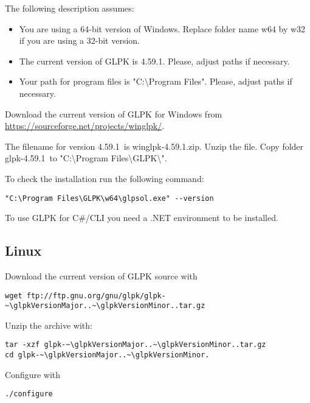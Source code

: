 \documentclass[a4paper,11pt]{report}
\newcommand{\glpkVersionMajor}{4}
\newcommand{\glpkVersionMinor}{59.1}
\begin{document}
The following description assumes:

\begin{itemize}
\item You are using a 64-bit version of Windows. Replace folder name w64 by w32
if you are using a 32-bit version.
\item The current version of GLPK is \glpkVersionMajor.\glpkVersionMinor.
Please, adjust paths if necessary.
\item Your path for program files is "C:\textbackslash Program Files". Please,
adjust paths if necessary.
\end{itemize}

Download the current version of GLPK for Windows from
\href{https://sourceforge.net/projects/winglpk/}{https://sourceforge.net/projects/winglpk/}.

The filename for version \glpkVersionMajor.\glpkVersionMinor\ is
winglpk-\glpkVersionMajor.\glpkVersionMinor.zip. Unzip the file. Copy folder
glpk-\glpkVersionMajor.\glpkVersionMinor\ to "C:\textbackslash Program
Files\textbackslash GLPK\textbackslash ".

To check the installation run the following command:

\begin{lstlisting}
"C:\Program Files\GLPK\w64\glpsol.exe" --version
\end{lstlisting}

To use GLPK for C\#/CLI you need a .NET environment to be installed.

\subsection{Linux}

Download the current version of GLPK source with

\begin{lstlisting}
wget ftp://ftp.gnu.org/gnu/glpk/glpk-~\glpkVersionMajor..~\glpkVersionMinor..tar.gz
\end{lstlisting}

Unzip the archive with:

\begin{lstlisting}
tar -xzf glpk-~\glpkVersionMajor..~\glpkVersionMinor..tar.gz
cd glpk-~\glpkVersionMajor..~\glpkVersionMinor.
\end{lstlisting}

Configure with

\begin{lstlisting}
./configure
\end{lstlisting}
\end{document}
